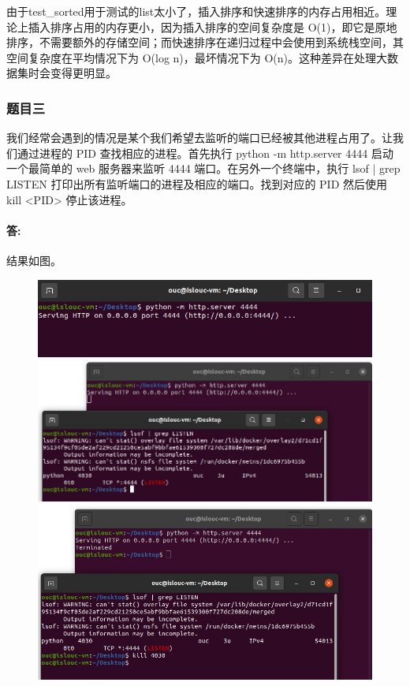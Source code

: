 \documentclass[a4paper, 12pt]{article}
\begin{document}
	由于test\_sorted用于测试的list太小了，插入排序和快速排序的内存占用相近。理论上插入排序占用的内存更小，因为插入排序的空间复杂度是 O(1)，即它是原地排序，不需要额外的存储空间；而快速排序在递归过程中会使用到系统栈空间，其空间复杂度在平均情况下为 O(log n)，最坏情况下为 O(n)。这种差异在处理大数据集时会变得更明显。
	
	\subsubsection{题目三}
	我们经常会遇到的情况是某个我们希望去监听的端口已经被其他进程占用了。让我们通过进程的 PID 查找相应的进程。首先执行 python -m http.server 4444 启动一个最简单的 web 服务器来监听 4444 端口。在另外一个终端中，执行 lsof | grep LISTEN 打印出所有监听端口的进程及相应的端口。找到对应的 PID 然后使用 kill <PID> 停止该进程。
	
	\paragraph{答:}
	结果如图。
		
	\begin{figure}[H]
		\centering
		\includegraphics[width=1\textwidth]{009.jpg}
		\includegraphics[width=1\textwidth]{010.jpg}
		\includegraphics[width=1\textwidth]{011.jpg}
	\end{figure}
	
\end{document}
